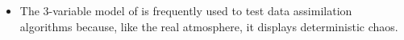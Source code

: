 \begin{itemize}
	\item The 3-variable model of \citet{Lorenz1963} is frequently used to test data assimilation algorithms because, like the real atmosphere, it displays deterministic chaos. 
\end{itemize}
